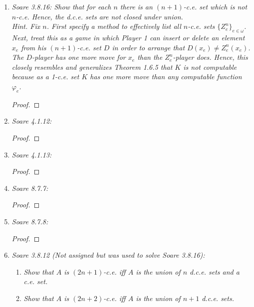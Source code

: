 \documentclass{article}
\begin{document}
\begin{enumerate}[label={\bf Q\arabic*:}]
\begin{proof}
      Consider the Turing functional $\Phi_e(x)$ such that given arbitrary
      $X\in2^\omega$ and $x\in\omega$, first computes the set
      $\{a<f(x): X(a)=1\}$, and then the set $\{f(0),\ldots,f(x-1)\}$, and
      returns 1 if the first set is not contained in the second, and
      returns 0 otherwise. Then $\Phi_e$ is total because $f$ is total
      recursive. Also, $D=\Phi_e^A$. Thus from the Truth-table theorem
      (Nerode, Theorem 3.8.5), $D\leq_{tt}A$.
    \end{proof}

  \item \it Soare 3.8.16: Show that for each $n$ there is an $(n+1)$-c.e.
    set which is not $n$-c.e. Hence, the d.c.e. sets are not closed under
    union. \\

    Hint. Fix $n$. First specify a method to effectively list all $n$-c.e.
    sets $\{Z_e^n\}_{e\in\omega}$. Next, treat this as a game in which
    Player 1 can insert or delete an element $x_e$ from his $(n+1)$-c.e.
    set $D$ in order to arrange that $D(x_e)\neq Z_e^n(x_e)$. The
    $D$-player has one more move for $x_e$ than the $Z_e^n$-player does.
    Hence, this closely resembles and generalizes Theorem 1.6.5 that $K$ is
    not computable because as a 1-c.e. set $K$ has one more move than any
    computable function $\varphi_e$.

    \begin{proof}
    \end{proof}

  \item \it Soare 4.1.12:
    \begin{proof}
    \end{proof}

  \item \it Soare 4.1.13:
    \begin{proof}
    \end{proof}

  \item \it Soare 8.7.7:
    \begin{proof}
    \end{proof}

  \item \it Soare 8.7.8:
    \begin{proof}
    \end{proof}

  \item \it Soare 3.8.12 (Not assigned but was used to solve Soare 3.8.16):
    \begin{enumerate}[label={(\roman*)}]
      \item \it Show that $A$ is $(2n+1)$-c.e. iff $A$ is the union of $n$
        d.c.e. sets and a c.e. set.
      \item \it Show that $A$ is $(2n+2)$-c.e. iff $A$ is the union of $n+1$
        d.c.e. sets.
    \end{enumerate}


\end{enumerate}
\end{document}
